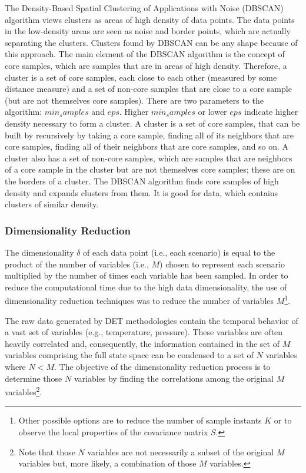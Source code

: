 The Density-Based Spatial Clustering of Applications with Noise (DBSCAN) algorithm views clusters as areas of high density of data points. The data points in the low-density areas are seen as noise and border points, which are actually separating the clusters. Clusters found by DBSCAN can be any shape because of this approach.
The main element of the DBSCAN algorithm is the concept of core samples, which are samples that are in areas of high density. Therefore, a cluster is a set of core samples, each close to each other (measured by some distance measure) and a set of non-core samples that are close to a core sample (but are not themselves core samples). There are two parameters to the algorithm: $min_samples$ and $eps$. Higher $min_samples$ or lower $eps$ indicate higher density necessary to form a cluster.
A cluster is a set of core samples, that can be built by recursively by taking a core sample, finding all of its neighbors that are core samples, finding all of their neighbors that are core samples, and so on. A cluster also has a set of non-core samples, which are samples that are neighbors of a core sample in the cluster but are not themselves core samples; these are on the borders of a cluster.
The DBSCAN algorithm finds core samples of high density and expands clusters from them. It is good for data, which contains clusters of similar density.

\subsubsection{Dimensionality Reduction}
\label{sec:6DimRed.section}

The dimensionality $\delta$ of each data point (i.e., each scenario) is equal to the product of the number of variables (i.e., $M$) chosen to represent each scenario multiplied by the number of times each variable has been sampled.
In order to reduce the computational time due to the high data dimensionality, the use of dimensionality reduction techniques was to reduce the number of variables $M$\footnote{Other possible options are to reduce the number of sample instants $K$ or to observe the local properties of the covariance matrix $S$.}.

The raw data generated by DET methodologies contain the temporal behavior of a vast set of variables (e.g., temperature, pressure). These variables are often heavily correlated and, consequently, the information contained in the set of $M$ variables comprising the full state space can be condensed to a set of $N$ variables where $N <M$. The objective of the dimensionality reduction process is to determine those $N$ variables by finding the correlations among the original $M$ variables\footnote{Note that those $N$ variables are not necessarily a subset of the original $M$ variables but, more likely, a combination of those $M$ variables.}.

